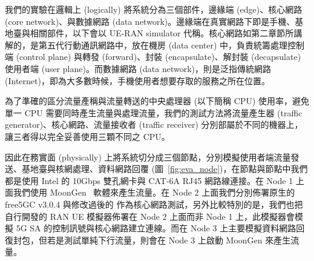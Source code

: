 我們的實驗在邏輯上 (logically) 將系統分為三個部件，邊緣端 (edge)、核心網路 (core network)、與數據網路 (data network)。邊緣端在真實網路下即是手機、基地臺與相關部件，以下會以 UE-RAN simulator 代稱。核心網路如第二章節所講解的，是第五代行動通訊網路中，放在機房 (data center) 中，負責統籌處理控制端 (control plane) 與轉發 (forward)、封裝 (encapsulate)、解封裝 (decapsulate) 使用者端 (user plane)。而數據網路 (data network)，則是泛指傳統網路 (Internet)，即為大多數時候，手機使用者想要存取的服務之所在位置。

為了準確的區分流量產稱與流量轉送的中央處理器 (以下簡稱 CPU) 使用率，避免單一 CPU 需要同時產生流量與處理流量，我們的測試方法將流量產生器 (traffic generator)、核心網路、流量接收者 (traffic receiver) 分別部屬於不同的機器上，讓三者得以完全妥善使用三顆不同之 CPU。

因此在務實面 (physically) 上將系統切分成三個節點，分別模擬使用者端流量發送、基地臺與核網處理、資料網路回覆 (圖~\ref{fig:eva_node})，在節點與節點中我們都是使用 Intel 的 10Gbps 雙孔網卡與 CAT-6A RJ45 網路線連接。在 Node 1 上面我們使用 MoonGen~\cite{paper.MoonGen} 軟體來產生流量。在 Node 2 上面我們分別佈署原生的 free5GC v3.0.4 與修改過後的 \LHCN 作為核心網路測試，另外比較特別的是，我們也把自行開發的 RAN UE 模擬器佈署在 Node 2 上面而非 Node 1 上，此模擬器會模擬 5G SA 的控制訊號與核心網路建立連線。而在 Node 3 上主要模擬資料網路回復封包，但若是測試單純下行流量，則會在 Node 3 上啟動 MoonGen 來產生流量。

